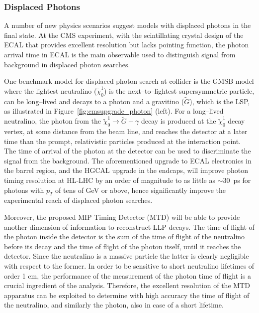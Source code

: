 \subsubsection{Displaced Photons}

A number of new physics scenarios suggest models with displaced photons in the final state. 
At the CMS experiment, with the scintillating crystal design of the ECAL that provides excellent resolution but lacks pointing function, the photon arrival time in ECAL is the main observable used to distinguish signal from
background in displaced photon searches. 

One benchmark model for displaced photon search at collider is the GMSB model 
where the lightest neutralino ($\tilde{\chi}_0^1$) is the next–to–lightest supersymmetric particle, can be long–lived and decays to a photon and a gravitino ($\tilde{G}$), which is the LSP, as illustrated in Figure~\ref{fig:cmsupgrade_photon} (left).
For a long–lived neutralino, the photon from the $\tilde{\chi}_0^1 \to \tilde{G} + \gamma$ decay is produced at the $\tilde{\chi}_0^1$
decay vertex, at some distance from the beam line, and reaches the detector at a later time than
the prompt, relativistic particles produced at the interaction point. 
The time of arrival of the photon at the detector can be used to discriminate the signal from the background.
The aforementioned upgrade to ECAL electronics in the barrel region, and the HGCAL upgrade in the endcaps, will improve photon timing resolution at HL-LHC by an order of magnitude to as little as $\sim30$~ps for photons with $p_T$ of tens of GeV or above, hence significantly improve the experimental reach of displaced photon searches. 

Moreover, the proposed MIP Timing Detector (MTD) will be able to provide another dimension of information to reconstruct LLP decays. 
The time of flight of the photon inside the detector is the sum of the time of flight of the neutralino before its decay and the time of flight of the photon itself, until it reaches the detector.
Since the neutralino is a massive particle the latter is clearly negligible with respect to the former. 
In order to be sensitive to short neutralino lifetimes of order 1 cm, the performance of the measurement of the photon time of flight is a crucial ingredient of the analysis. 
Therefore, the excellent resolution of the MTD apparatus can be exploited to determine with high accuracy the time of flight of the neutralino, and similarly the photon, also in case of a short lifetime.

